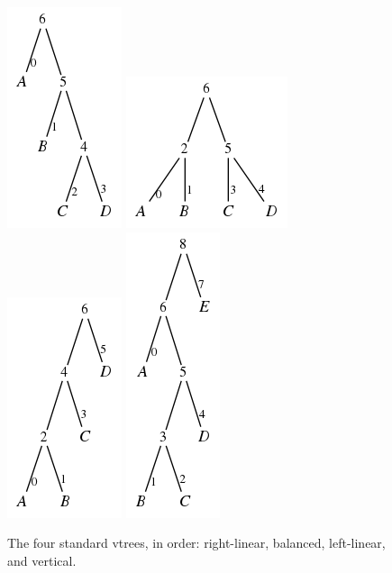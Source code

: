 \documentclass[11pt]{article}
\begin{document}
\begin{figure}
\centering
\includegraphics[scale=0.4]{rightlinearABCD.png}
\quad
\includegraphics[scale=0.4]{balancedABCD.png}
\quad
\includegraphics[scale=0.4]{leftlinearABCD.png}
\quad
\includegraphics[scale=0.4]{verticalABCDE.png}
\caption{The four standard vtrees, in order: right-linear, balanced, left-linear, and vertical.}
\label{fig:std_vtrees_example}
\end{figure}
\end{document}
